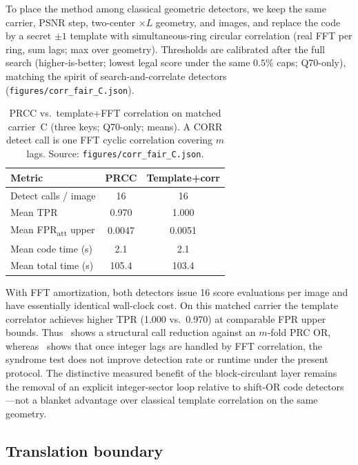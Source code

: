 \documentclass[11pt,a4paper]{article}
\begin{document}
To place the method among classical geometric detectors, we keep the same carrier,
PSNR step, two-center \(\times L\) geometry, and images, and replace the code by a
secret \(\pm 1\) template with simultaneous-ring circular correlation (real FFT per
ring, sum lags; max over geometry).
Thresholds are calibrated after the full search (higher-is-better; lowest legal
score under the same \(0.5\%\) caps; Q70-only), matching the spirit of
search-and-correlate detectors~\cite{lin2001rst}
(\texttt{figures/corr\_fair\_C.json}).

\begin{table}[t]
\centering
\caption{PRCC vs.\ template+FFT correlation on matched carrier~C (three keys;
Q70-only; means).
A CORR detect call is one FFT cyclic correlation covering \(m\) lags.
Source: \texttt{figures/corr\_fair\_C.json}.}
\label{tab:corr}
\begin{tabular}{@{}lcc@{}}
\toprule
Metric & PRCC & Template+corr \\
\midrule
Detect calls / image & 16 & 16 \\
Mean TPR & 0.970 & 1.000 \\
Mean FPR\textsubscript{att} upper & 0.0047 & 0.0051 \\
Mean code time (s) & 2.1 & 2.1 \\
Mean total time (s) & 105.4 & 103.4 \\
\bottomrule
\end{tabular}
\end{table}

With FFT amortization, both detectors issue 16 score evaluations per image and have
essentially identical wall-clock cost.
On this matched carrier the template correlator achieves higher TPR (1.000 vs.\
0.970) at comparable FPR upper bounds.
Thus~ shows a structural call reduction against an \(m\)-fold PRC OR,
whereas~\Cref{tab:corr} shows that once integer lags are handled by FFT correlation,
the syndrome test does not improve detection rate or runtime under the present
protocol.
The distinctive measured benefit of the block-circulant layer remains the removal of
an explicit integer-sector loop relative to shift-OR code detectors---not a blanket
advantage over classical template correlation on the same geometry.

\subsection{Translation boundary}
\label{sec:shift}
\end{document}
